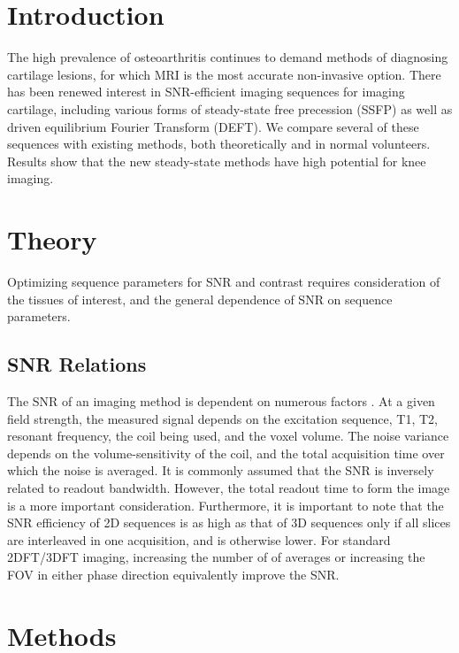 
\section*{Introduction}


The high prevalence of osteoarthritis continues to
demand methods of diagnosing cartilage lesions, for which 
MRI is the most accurate non-invasive option.
There has been renewed interest
in SNR-efficient imaging sequences for
imaging cartilage, including various forms of
steady-state free precession (SSFP)
as well as driven equilibrium Fourier Transform (DEFT).  
We compare several of these sequences with existing
methods, both theoretically and in normal volunteers.  Results
show that the new steady-state methods have high potential for
knee imaging.


\section*{Theory}

Optimizing sequence parameters for SNR and contrast
requires consideration of the tissues of interest,
and the general dependence of SNR on sequence parameters.



\subsection*{SNR Relations}

The SNR of an imaging method is dependent on numerous factors
\cite{Macovski}.  
At a given field strength, the measured signal depends on the 
excitation sequence, T1, T2, resonant frequency, the coil
being used, and the voxel volume.  
The noise variance depends on the volume-sensitivity of the coil,
and the total acquisition time over which the noise is averaged.
It is commonly assumed that the SNR is inversely related to
readout bandwidth.  However, the total readout time to form the
image is a more important consideration.  Furthermore, it is important
to note that the SNR efficiency of 2D sequences is as high as that
of 3D sequences only if all slices are interleaved in one acquisition, and is
otherwise lower.  
For standard 2DFT/3DFT imaging, increasing the number of of averages
or increasing the FOV in either phase direction 
equivalently improve the SNR.  


\section*{Methods}

